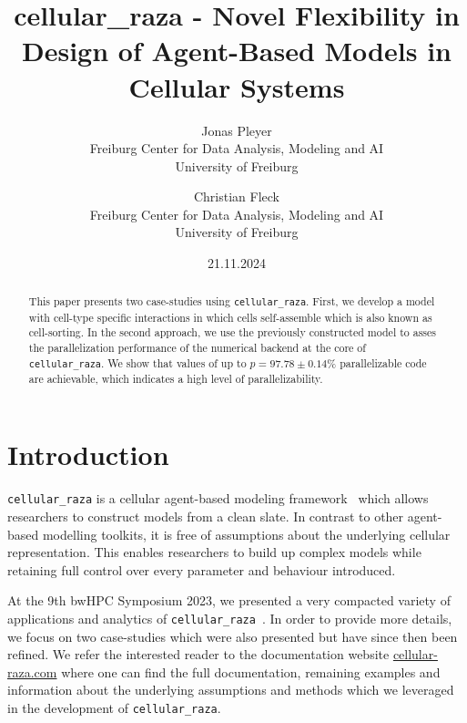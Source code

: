 \documentclass[fontsize=11pt,a4paper]{article}
\title{cellular\_raza - Novel Flexibility in Design of Agent-Based Models in Cellular Systems}
\author{
    Jonas Pleyer\\
    Freiburg Center for Data Analysis, Modeling and AI\\
    University of Freiburg
        \and
    Christian Fleck\\
    Freiburg Center for Data Analysis, Modeling and AI\\
    University of Freiburg
}
\date{21.11.2024}
\begin{document}
\maketitle

%
%

\begin{abstract}
    This paper presents two case-studies using \lstinline{cellular_raza}.
    First, we develop a model with cell-type specific interactions in which cells self-assemble
    which is also known as cell-sorting.
    In the second approach, we use the previously constructed model to asses the parallelization
    performance of the numerical backend at the core of \lstinline{cellular_raza}.
    We show that values of up to $p=97.78\pm0.14\%$ parallelizable code are achievable, which
    indicates a high level of parallelizability.
\end{abstract}

\section{Introduction}\label{introduction}

\lstinline{cellular_raza} is a cellular agent-based modeling framework~\cite{Pleyer2023} which 
allows researchers to construct models from a clean slate.
In contrast to other agent-based modelling toolkits, it is free of assumptions about the underlying
cellular representation.
This enables researchers to build up complex models while retaining full control over every
parameter and behaviour introduced.

At the 9th bwHPC Symposium 2023, we presented a very compacted variety of applications and analytics
of \lstinline{cellular_raza}~\cite{PeaceOfPostersbwHPC}.
In order to provide more details, we focus on two case-studies which were also presented but have
since then been refined.
We refer the interested reader to the documentation website
\href{https://cellular-raza.com}{cellular-raza.com} where one can find the full documentation,
remaining examples and information about the underlying assumptions and methods which we leveraged
in the development of \lstinline{cellular_raza}.

\end{document}
